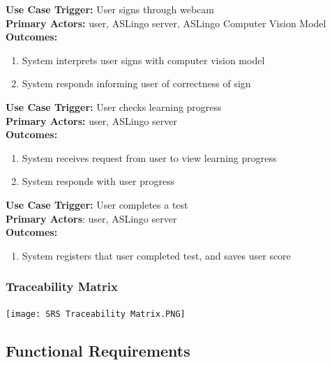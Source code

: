 \documentclass[12pt, titlepage]{article}
\begin{document}
  \textbf{Use Case Trigger:} User signs through webcam\\
  \textbf{Primary Actors:} user, ASLingo server, ASLingo Computer Vision Model\\
  \textbf{Outcomes:}
  \begin{enumerate}
      \item System interprets user signs with computer vision model
      \item System responds informing user of correctness of sign
  \end{enumerate}
  \textbf{Use Case Trigger:} User checks learning progress\\
  \textbf{Primary Actors:} user, ASLingo server\\
  \textbf{Outcomes:}
  \begin{enumerate}
      \item System receives request from user to view learning progress
      \item System responds with user progress
  \end{enumerate}
  \textbf{Use Case Trigger:} User completes a test\\
  \textbf{Primary Actors}: user, ASLingo server\\
  \textbf{Outcomes:}
  \begin{enumerate}
      \item System registers that user completed test, and saves user score
  \end{enumerate}

  \subsubsection{Traceability Matrix}

  \texttt{[image: SRS Traceability Matrix.PNG]}

\subsection{Functional Requirements}
 
\end{document}
